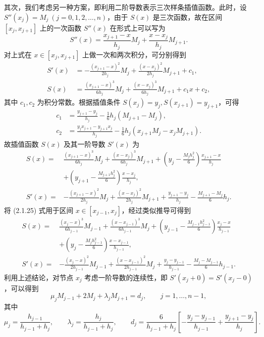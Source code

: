 其次，我们考虑另一种方案，即利用二阶导数表示三次样条插值函数。此时，设 $S''(x_j)=M_j\ (j=0,1,2,\ldots,n)$，由于 $S(x)$ 是三次函数，故在区间 $[x_j,x_{j+1}]$ 上的一次函数 $S''(x)$ 在形式上可以写为
\begin{equation}
S''(x)=\frac{x_{j+1}-x}{h_j}M_j+\frac{x-x_j}{h_j}M_{j+1}.
\tag{2.1.25}
\end{equation}
对上式在 $x\in[x_j,x_{j+1}]$ 上做一次和两次积分，可分别得到
\begin{align*}
S'(x)&=-\frac{(x_{j+1}-x)^2}{2h_j}M_j+\frac{(x-x_j)^2}{2h_j}M_{j+1}+c_1,\\
S(x)&=\frac{(x_{j+1}-x)^3}{6h_j}M_j+\frac{(x-x_j)^3}{6h_j}M_{j+1}+c_1x+c_2,
\end{align*}
其中 $c_1,c_2$ 为积分常数。根据插值条件 $S(x_j)=y_j,S(x_{j+1})=y_{j+1}$，可得
\[
\begin{aligned}
c_1&=\frac{y_{j+1}-y_j}{h_j}-\frac16 h_j(M_{j+1}-M_j),\\
c_2&=\frac{y_jx_{j+1}-y_{j+1}x_j}{h_j}-\frac16h_j(x_{j+1}M_j-x_jM_{j+1}).
\end{aligned}
\]
故插值函数 $S(x)$ 及其一阶导数 $S'(x)$ 为
\[
\begin{aligned}
S(x)={}&\frac{(x_{j+1}-x)^3}{6h_j}M_j+\frac{(x-x_j)^3}{6h_j}M_{j+1}
+\left(y_j-\frac{M_jh_j^2}{6}\right)\frac{x_{j+1}-x}{h_j}\\
&+\left(y_{j+1}-\frac{M_{j+1}h_j^2}{6}\right)\frac{x-x_j}{h_j},\\
S'(x)={}&-\frac{(x_{j+1}-x)^2}{2h_j}M_j+\frac{(x-x_j)^2}{2h_j}M_{j+1}
+\frac{y_{j+1}-y_j}{h_j}-\frac{M_{j+1}-M_j}{6}h_j.
\end{aligned}
\]
将 (2.1.25) 式用于区间 $x\in[x_{j-1},x_j]$，经过类似推导可得到
\[
\begin{aligned}
S(x)={}&\frac{(x_j-x)^3}{6h_{j-1}}M_{j-1}+\frac{(x-x_{j-1})^3}{6h_{j-1}}M_j
+\left(y_{j-1}-\frac{M_{j-1}h_{j-1}^2}{6}\right)\frac{x_j-x}{h_{j-1}}\\
&+\left(y_j-\frac{M_jh_{j-1}^2}{6}\right)\frac{x-x_{j-1}}{h_{j-1}},\\
S'(x)={}&-\frac{(x_j-x)^2}{2h_{j-1}}M_{j-1}+\frac{(x-x_{j-1})^2}{2h_{j-1}}M_j
+\frac{y_j-y_{j-1}}{h_{j-1}}-\frac{M_j-M_{j-1}}{6}h_{j-1}.
\end{aligned}
\]
利用上述结论，对节点 $x_j$ 考虑一阶导数的连续性，即 $S'(x_j+0)=S'(x_j-0)$，可以得到
\begin{equation}
\mu_jM_{j-1}+2M_j+\lambda_jM_{j+1}=d_j,\qquad j=1,\ldots,n-1,
\tag{2.1.26}
\end{equation}
其中
\[
\mu_j=\frac{h_{j-1}}{h_{j-1}+h_j},\qquad
\lambda_j=\frac{h_j}{h_{j-1}+h_j},\qquad
d_j=\frac{6}{h_{j-1}+h_j}\left[-\frac{y_j-y_{j-1}}{h_{j-1}}+\frac{y_{j+1}-y_j}{h_j}\right].
\]
